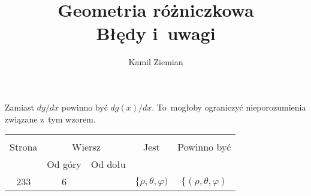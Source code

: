 \documentclass[a4paper,11pt]{article}
\title{Geometria różniczkowa \\
  Błędy i~uwagi}
\author{Kamil Ziemian}
\begin{document}





\maketitle %









\start {} Zamiast $dy/dx$ powinno być $d g( x )/dx$.
To~mogłoby ograniczyć nieporozumienia związane z~tym wzorem.

\vspace{\spaceFour}







\begin{center}

  \begin{tabular}{|c|c|c|c|c|}
    \hline
    & \multicolumn{2}{c|}{} & & \\
    Strona & \multicolumn{2}{c|}{Wiersz} & Jest
                              & Powinno być \\ \cline{2-3}
    & Od góry & Od dołu & & \\
    \hline
    233 &  6 & & $\{ \rho, \theta, \varphi )$ & $\{ ( \rho, \theta, \varphi )$ \\
    \hline
  \end{tabular}

\end{center}

\vspace{\spaceTwo}
\end{document}
